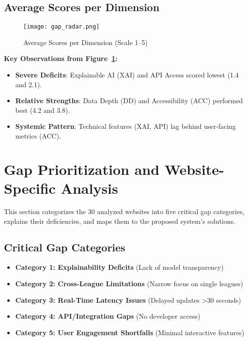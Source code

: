 \subsection{Average Scores per Dimension}
\begin{figure}[h!]
    \centering
    \texttt{[image: gap\_radar.png]}
    \caption{Average Scores per Dimension (Scale 1–5)}
    \label{fig:gap-radar}
\end{figure}
\textbf{Key Observations from Figure~\ref{fig:gap-radar}:}
\begin{itemize}
    \item \textbf{Severe Deficits}: Explainable AI (XAI) and API Access scored lowest (1.4 and 2.1).
    \item \textbf{Relative Strengths}: Data Depth (DD) and Accessibility (ACC) performed best (4.2 and 3.8).
    \item \textbf{Systemic Pattern}: Technical features (XAI, API) lag behind user-facing metrics (ACC).
\end{itemize}

\section{Gap Prioritization and Website-Specific Analysis}
This section categorizes the 30 analyzed websites into five critical gap categories, explains their deficiencies, and maps them to the proposed system’s solutions.

\subsection{Critical Gap Categories}
\begin{itemize}
\item \textbf{Category 1: Explainability Deficits} (Lack of model transparency)
\item \textbf{Category 2: Cross-League Limitations} (Narrow focus on single leagues)
\item \textbf{Category 3: Real-Time Latency Issues} (Delayed updates >30 seconds)
\item \textbf{Category 4: API/Integration Gaps} (No developer access)
\item \textbf{Category 5: User Engagement Shortfalls} (Minimal interactive features)
\end{itemize}

